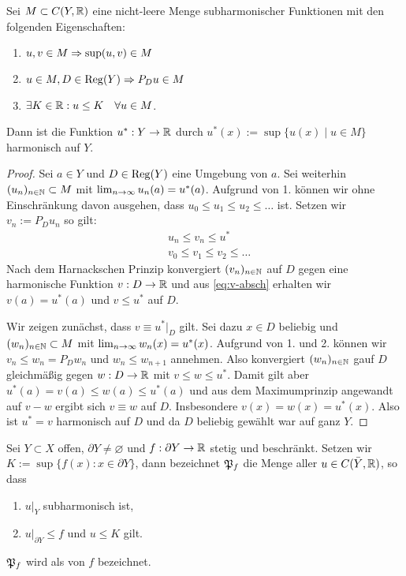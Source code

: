 \begin{lemma}[Perron]
  \label{lemma:perron}
  Sei $M \subset C(Y, \mathbb{R})$ eine nicht-leere Menge subharmonischer
  Funktionen mit den folgenden Eigenschaften:
  \begin{enumerate}
  \item $u,v \in M \Rightarrow \sup(u,v) \in M$
  \item $u \in M, D \in \operatorname{Reg}(Y) \Rightarrow P_Du \in M$
  \item $\exists K \in \mathbb{R}: u \leq K \quad \forall u \in M$.
  \end{enumerate}
  Dann ist die Funktion $u^\ast : Y \rightarrow \mathbb{R}$ durch $u^\ast(x) :=
  \sup\{u(x) \mid u \in M \}$ harmonisch auf $Y$.
\end{lemma}

\begin{proof}
  Sei $a \in Y$ und $D \in \operatorname{Reg}(Y)$ eine Umgebung von $a$. Sei
  weiterhin $(u_n)_{n \in \mathbb{N}} \subset M$ mit $\lim_{n \rightarrow \infty}
  u_n(a) = u^\ast(a)$. Aufgrund von 1. können wir ohne Einschränkung davon ausgehen, dass
  $u_0 \leq u_1 \leq u_2 \leq \dots$ ist. Setzen wir $v_n := P_D u_n$ so gilt:
  \begin{align}
   & u_n \leq v_n \leq u^\ast \label{eq:v-absch}\\
   & v_0 \leq v_1 \leq v_2 \leq \dots \nonumber
  \end{align}
  Nach dem Harnackschen Prinzip konvergiert $(v_n)_{n \in \mathbb{N}}$ auf $D$
  gegen eine harmonische Funktion $v: D \rightarrow \mathbb{R}$ und aus
  \eqref{eq:v-absch} erhalten wir $v(a) = u^\ast(a)$ und $v \leq
  u^\ast$ auf $D$.
  
  Wir zeigen zunächst, dass $v \equiv u^\ast|_D$ gilt. Sei dazu $x \in
  D$ beliebig und $(w_n)_{n\in \mathbb{N}}\subset M$ mit
  $\lim_{n \rightarrow \infty}w_n(x) = u^\ast(x)$. Aufgrund von 1. und
  2. können wir $v_n \leq w_n = P_D w_n$ und $w_n
  \leq w_{n+1}$ annehmen. Also konvergiert $(w_n)_{n \in \mathbb{N}}$ gauf $D$
  gleichmäßig gegen $w: D \rightarrow \mathbb{R}$ mit $v \leq w \leq u^\ast$. Damit
  gilt aber $u^\ast(a) = v(a) \leq w(a) \leq u^\ast(a)$ und aus
  dem Maximumprinzip angewandt auf $v-w$ ergibt sich $v \equiv w$ auf
  $D$. Insbesondere $v(x) = w(x) = u^\ast(x)$. Also ist $u^\ast = v$
  harmonisch auf $D$ und da $D$ beliebig gewählt
  war auf ganz $Y$.
\end{proof}

\begin{defin}
  \label{def:perron}
  Sei $Y \subset X$ offen, $\partial Y \neq \varnothing$ und
  $f: \partial Y \rightarrow \mathbb{R}$ stetig und beschränkt. Setzen wir $K :=
  \sup\{f(x) : x \in \partial Y\}$, dann bezeichnet
  $\mathfrak{P}_f$ die Menge aller $u \in C(\bar Y, \mathbb{R})$, so dass
  \begin{enumerate}
  \item $u|_Y$ subharmonisch ist,
  \item $u|_{\partial Y} \leq f$ und $u \leq K$ gilt.
  \end{enumerate}
  $\mathfrak{P}_f$ wird als  von $f$ bezeichnet.
\end{defin}

